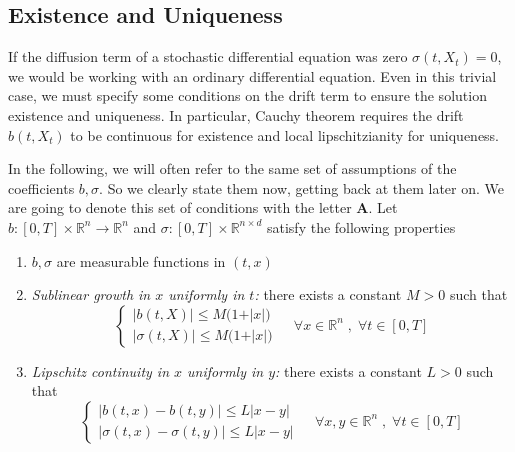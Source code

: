 \subsection{Existence and Uniqueness}
If the diffusion term of a stochastic differential equation was zero $\sigma(t,X_t) = 0$, we would be working with an ordinary differential equation. Even in this trivial case, we must specify some conditions on the drift term to ensure the solution existence and uniqueness. In particular, Cauchy theorem requires the drift $b(t,X_t)$ to be continuous for existence and local lipschitzianity for uniqueness. 

In the following, we will often refer to the same set of assumptions of the coefficients $b,\sigma$. So we clearly state them now, getting back at them later on. We are going to denote this set of conditions with the letter $\textbf{A}$. Let $b : [0,T] \times \mathbb{R}^n \to \mathbb{R}^n$ and $\sigma : [0,T] \times \mathbb{R}^{n\times d}$ satisfy the following properties

\begin{enumerate}
    \item $b,\sigma$ are measurable functions in $(t,x)$
    \item \textit{Sublinear growth in $x$ uniformly in $t$:} there exists a constant $M > 0$ such that
    \begin{equation*}
        \begin{cases}
            \vert b(t,X) \vert \leq M\big(1+\vert x \vert\big) \\
            \vert \sigma(t,X) \vert \leq M\big( 1 + \vert x \vert \big)
        \end{cases}
        \;\;\;\;
        \forall x \in \mathbb{R}^n \; , \; \forall t \in [0,T]
    \end{equation*}
    \item \textit{Lipschitz continuity in $x$ uniformly in $y$:} there exists a constant $L > 0$ such that
    \begin{equation*}
        \begin{cases}
            \vert b(t,x) - b(t,y) \vert \leq L\vert x-y \vert \\
            \vert \sigma(t,x)-\sigma(t,y) \vert \leq L\vert x - y \vert
        \end{cases}
        \;\;\;\;
        \forall x,y \in \mathbb{R}^n \; , \; \forall t \in [0,T]
    \end{equation*}
\end{enumerate}

